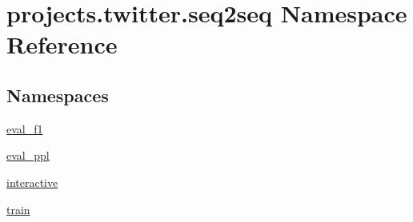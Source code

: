 \hypertarget{namespaceprojects_1_1twitter_1_1seq2seq}{}\section{projects.\+twitter.\+seq2seq Namespace Reference}
\label{namespaceprojects_1_1twitter_1_1seq2seq}
\subsection*{Namespaces}
\begin{DoxyCompactItemize}
\item 
 \hyperlink{namespaceprojects_1_1twitter_1_1seq2seq_1_1eval__f1}{eval\+\_\+f1}
\item 
 \hyperlink{namespaceprojects_1_1twitter_1_1seq2seq_1_1eval__ppl}{eval\+\_\+ppl}
\item 
 \hyperlink{namespaceprojects_1_1twitter_1_1seq2seq_1_1interactive}{interactive}
\item 
 \hyperlink{namespaceprojects_1_1twitter_1_1seq2seq_1_1train}{train}
\end{DoxyCompactItemize}
